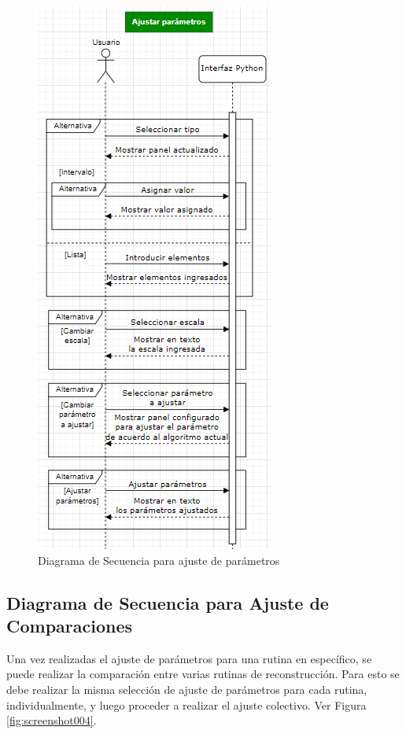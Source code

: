 \documentclass[12pt,twoside,letter]{ol-softwaremanual}
\begin{document}
\begin{figure}
	\centering
	\includegraphics[width=0.48\linewidth]{figures/screenshot003}
	\caption{Diagrama de Secuencia para ajuste de parámetros}
	\label{fig:screenshot003}
\end{figure}

\subsection{Diagrama de Secuencia para Ajuste de Comparaciones}

Una vez realizadas el ajuste de parámetros para una rutina en específico, se puede realizar la comparación entre varias rutinas de reconstrucción. Para esto se debe realizar la misma selección de ajuste de parámetros para cada rutina, individualmente, y luego proceder a realizar el ajuste colectivo. Ver Figura \ref{fig:screenshot004}.
\end{document}
